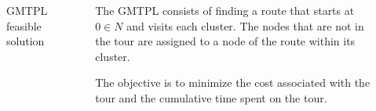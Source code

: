 \documentclass[aspectratio=169]{beamer}
\begin{document}
\begin{frame}
\begin{columns}
\begin{figure}[ht]
{    			\caption{GMTPL feasible solution}}
    \end{figure}
\begin{definition}
The GMTPL consists of finding a route that starts at $0 \in N$ and visits each cluster. The nodes that are not in the tour are assigned to a node of the route within its cluster.

The objective is to minimize the cost associated with the tour and the cumulative time spent on the tour.
\end{definition}
\end{columns}
\end{frame}
\end{document}
